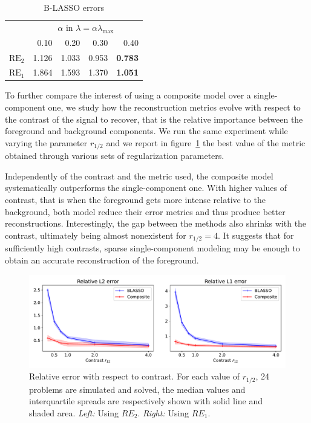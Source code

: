         \begin{table}[b]
            \centering
            \begin{tabular}{l|rrrr}
                \toprule
                 & \multicolumn{4}{c}{$\alpha$ in $\lambda = \alpha \lambda_{\mathrm{max}}$} \\
                \cmidrule(lr){2-5}
                 & 0.10 & 0.20 & 0.30 & 0.40 \\
                \midrule
                $\mathrm{RE}_2$ & 1.126 & 1.033 & 0.953 & \textbf{0.783} \\
                $\mathrm{RE}_1$ & 1.864 & 1.593 & 1.370 & \textbf{1.051} \\
                \bottomrule
            \end{tabular}
            \caption{B-LASSO errors \label{tab:blasso}}
        \end{table}

        To further compare the interest of using a composite model over a single-component one, we study how the reconstruction metrics evolve with respect to the contrast of the signal to recover, that is the relative importance between the foreground and background components. We run the same experiment while varying the parameter $r_{1/2}$ and we report in figure~\ref{fig:bench:metrics-vs-r} the best value of the metric obtained through various sets of regularization parameters.

        Independently of the contrast and the metric used, the composite model systematically outperforms the single-component one. With higher values of contrast, that is when the foreground gets more intense relative to the background, both model reduce their error metrics and thus produce better reconstructions. Interestingly, the gap between the methods also shrinks with the contrast, ultimately being almost nonexistent for $r_{1/2} = 4$. It suggests that for sufficiently high contrasts, sparse single-component modeling may be enough to obtain an accurate reconstruction of the foreground.

        \begin{figure}[t]
            \centering
            \includegraphics[width=\linewidth]{figures/benchmark/error_vs_r12.pdf}        
            \caption{Relative error with respect to contrast. For each value of $r_{1/2}$, 24 problems are simulated and solved, the median values and interquartile spreads are respectively shown with solid line and shaded area. \textit{Left:} Using $RE_2$. \textit{Right:} Using $RE_1$.}
            \label{fig:bench:metrics-vs-r}
        \end{figure}



